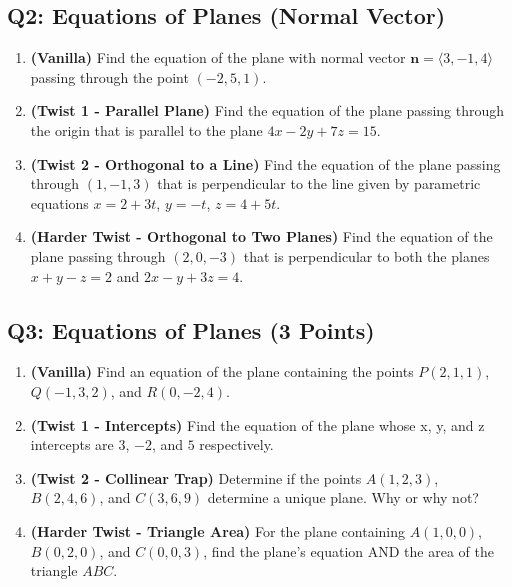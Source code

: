 \documentclass[11pt]{article}
\begin{document}
\subsection{Q2: Equations of Planes (Normal Vector)}
\begin{enumerate}[label=\textbf{2\alph*.}]
    \item \textbf{(Vanilla)} Find the equation of the plane with normal vector $\mathbf{n} = \langle 3, -1, 4 \rangle$ passing through the point $(-2, 5, 1)$.
    \item \textbf{(Twist 1 - Parallel Plane)} Find the equation of the plane passing through the origin that is parallel to the plane $4x - 2y + 7z = 15$.
    \item \textbf{(Twist 2 - Orthogonal to a Line)} Find the equation of the plane passing through $(1, -1, 3)$ that is perpendicular to the line given by parametric equations $x = 2+3t$, $y = -t$, $z = 4+5t$.
    \item \textbf{(Harder Twist - Orthogonal to Two Planes)} Find the equation of the plane passing through $(2, 0, -3)$ that is perpendicular to both the planes $x + y - z = 2$ and $2x - y + 3z = 4$.
\end{enumerate}

\subsection{Q3: Equations of Planes (3 Points)}
\begin{enumerate}[label=\textbf{3\alph*.}]
    \item \textbf{(Vanilla)} Find an equation of the plane containing the points $P(2, 1, 1)$, $Q(-1, 3, 2)$, and $R(0, -2, 4)$.
    \item \textbf{(Twist 1 - Intercepts)} Find the equation of the plane whose x, y, and z intercepts are $3$, $-2$, and $5$ respectively.
    \item \textbf{(Twist 2 - Collinear Trap)} Determine if the points $A(1, 2, 3)$, $B(2, 4, 6)$, and $C(3, 6, 9)$ determine a unique plane. Why or why not?
    \item \textbf{(Harder Twist - Triangle Area)} For the plane containing $A(1, 0, 0)$, $B(0, 2, 0)$, and $C(0, 0, 3)$, find the plane's equation AND the area of the triangle $ABC$.
\end{enumerate}
\end{document}
